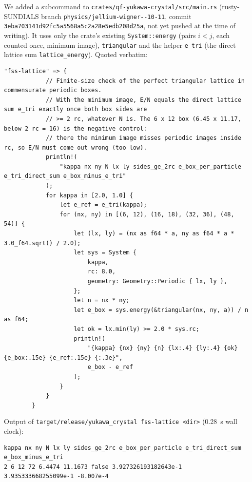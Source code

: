 \begin{numbox}
\tierX{} We added a subcommand to \texttt{crates/\allowbreak qf-yukawa-crystal/\allowbreak src/\allowbreak main.rs}
(rusty-SUNDIALS branch \texttt{physics/\allowbreak jellium-\allowbreak wigner--10-11}, commit
\texttt{3eba703141d92fc5a5568a5c2a28e5edb208d25a}, not yet pushed at the time of writing). It uses only the crate's
existing \texttt{System::energy} (pairs $i<j$, each counted once, minimum image), \texttt{triangular} and the helper
\texttt{e\_tri} (the direct lattice sum \texttt{lattice\_energy}). Quoted verbatim:
\begin{lstlisting}[language={},title={main.rs at 3eba703, lines 607--633}]
        "fss-lattice" => {
            // Finite-size check of the perfect triangular lattice in commensurate periodic boxes.
            // With the minimum image, E/N equals the direct lattice sum e_tri exactly once both box sides are
            // >= 2 rc, whatever N is. The 6 x 12 box (6.45 x 11.17, below 2 rc = 16) is the negative control:
            // there the minimum image misses periodic images inside rc, so E/N must come out wrong (too low).
            println!(
                "kappa nx ny N lx ly sides_ge_2rc e_box_per_particle e_tri_direct_sum e_box_minus_e_tri"
            );
            for kappa in [2.0, 1.0] {
                let e_ref = e_tri(kappa);
                for (nx, ny) in [(6, 12), (16, 18), (32, 36), (48, 54)] {
                    let (lx, ly) = (nx as f64 * a, ny as f64 * a * 3.0_f64.sqrt() / 2.0);
                    let sys = System {
                        kappa,
                        rc: 8.0,
                        geometry: Geometry::Periodic { lx, ly },
                    };
                    let n = nx * ny;
                    let e_box = sys.energy(&triangular(nx, ny, a)) / n as f64;
                    let ok = lx.min(ly) >= 2.0 * sys.rc;
                    println!(
                        "{kappa} {nx} {ny} {n} {lx:.4} {ly:.4} {ok} {e_box:.15e} {e_ref:.15e} {:.3e}",
                        e_box - e_ref
                    );
                }
            }
        }
\end{lstlisting}
Output of \texttt{target/release/yukawa\_crystal fss-lattice <dir>} (0.28~s wall clock):
\begin{lstlisting}[language={},basicstyle=\ttfamily\scriptsize,title={yukawa\_crystal fss-lattice}]
kappa nx ny N lx ly sides_ge_2rc e_box_per_particle e_tri_direct_sum e_box_minus_e_tri
2 6 12 72 6.4474 11.1673 false 3.927326193182643e-1 3.935333668255099e-1 -8.007e-4

\end{lstlisting}
\end{numbox}
